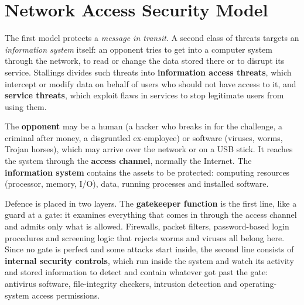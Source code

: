 \section{Network Access Security Model}\label{sec:accessmodel}

The first model protects a \emph{message in transit}. A second class of threats targets an \emph{information system} itself: an opponent tries to get into a computer system through the network, to read or change the data stored there or to disrupt its service. Stallings divides such threats into \textbf{information access threats}, which intercept or modify data on behalf of users who should not have access to it, and \textbf{service threats}, which exploit flaws in services to stop legitimate users from using them.

\begin{center}
\end{center}

The \textbf{opponent} may be a human (a hacker who breaks in for the challenge, a criminal after money, a disgruntled ex-employee) or software (viruses, worms, Trojan horses), which may arrive over the network or on a USB stick. It reaches the system through the \textbf{access channel}, normally the Internet. The \textbf{information system} contains the assets to be protected: computing resources (processor, memory, I/O), data, running processes and installed software.

Defence is placed in two layers. The \textbf{gatekeeper function} is the first line, like a guard at a gate: it examines everything that comes in through the access channel and admits only what is allowed. Firewalls, packet filters, password-based login procedures and screening logic that rejects worms and viruses all belong here. Since no gate is perfect and some attacks start inside, the second line consists of \textbf{internal security controls}, which run inside the system and watch its activity and stored information to detect and contain whatever got past the gate: antivirus software, file-integrity checkers, intrusion detection and operating-system access permissions.


